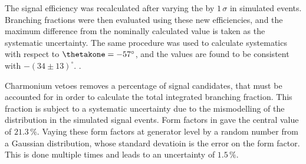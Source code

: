 The signal efficiency was recalculated after varying the \thetakone by $1\,\sigma$ in simulated
 events.
Branching fractions were then evaluated using these new efficiencies, and the maximum difference
from the nominally calculated value is taken as the systematic uncertainty.
The same procedure was used to calculate systematics with respect to $\thetakone=-57^\circ$, and
the values are found to be consistent with $-(34\pm13)^\circ$.
.

Charmonium vetoes removes a percentage of signal candidates, that must be accounted for in order to
calculate the total integrated branching fraction.
This fraction is subject to a systematic uncertainty due to the mismodelling of the \qsq
distribution in the simulated signal events.
Form factors in  gave the central value of $21.3\,\%$.
Vaying these form factors at generator level by a random number from a Gaussian distribution, whose
standard devatioin is the error on the form factor.
This is done multiple times and leads to an uncertainty of $1.5\,\%$.























